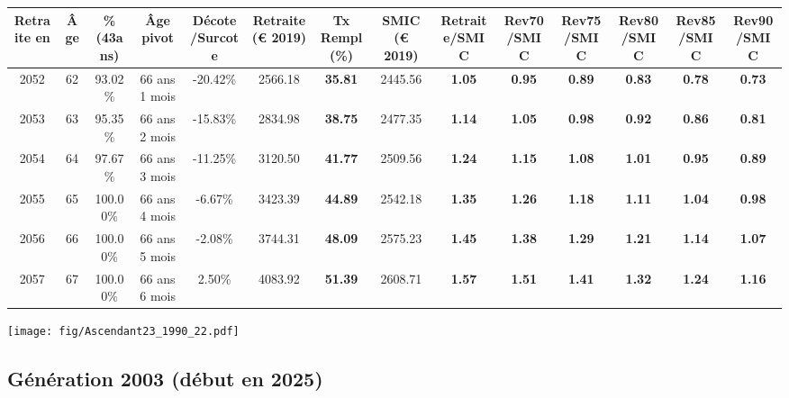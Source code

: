 \begin{adjustbox}{max width=\textwidth} 
\begin{tabular}[htb]{|c|c||c|c|c||c|c||c||c|c|c|c|c|c|} 
\hline 
 Retraite en &  Âge &  \%(43ans) &  Âge pivot &  Décote/Surcote &  Retraite (\euro{} 2019) &  Tx Rempl(\%) &  SMIC (\euro{} 2019) &  Retraite/SMIC &  Rev70/SMIC &  Rev75/SMIC &  Rev80/SMIC &  Rev85/SMIC &  Rev90/SMIC \\ 
\hline \hline 
 2052 &  62 &  93.02\% &  66 ans 1 mois &  -20.42\% &  2566.18 &  {\bf 35.81} &  2445.56 &  {\bf 1.05} &  {\bf {\color{red} 0.95}} &  {\bf {\color{red} 0.89}} &  {\bf {\color{red} 0.83}} &  {\bf {\color{red} 0.78}} &  {\bf {\color{red} 0.73}} \\ 
\hline 
 2053 &  63 &  95.35\% &  66 ans 2 mois &  -15.83\% &  2834.98 &  {\bf 38.75} &  2477.35 &  {\bf 1.14} &  {\bf 1.05} &  {\bf {\color{red} 0.98}} &  {\bf {\color{red} 0.92}} &  {\bf {\color{red} 0.86}} &  {\bf {\color{red} 0.81}} \\ 
\hline 
 2054 &  64 &  97.67\% &  66 ans 3 mois &  -11.25\% &  3120.50 &  {\bf 41.77} &  2509.56 &  {\bf 1.24} &  {\bf 1.15} &  {\bf 1.08} &  {\bf 1.01} &  {\bf {\color{red} 0.95}} &  {\bf {\color{red} 0.89}} \\ 
\hline 
 2055 &  65 &  100.00\% &  66 ans 4 mois &  -6.67\% &  3423.39 &  {\bf 44.89} &  2542.18 &  {\bf 1.35} &  {\bf 1.26} &  {\bf 1.18} &  {\bf 1.11} &  {\bf 1.04} &  {\bf {\color{red} 0.98}} \\ 
\hline 
 2056 &  66 &  100.00\% &  66 ans 5 mois &  -2.08\% &  3744.31 &  {\bf 48.09} &  2575.23 &  {\bf 1.45} &  {\bf 1.38} &  {\bf 1.29} &  {\bf 1.21} &  {\bf 1.14} &  {\bf 1.07} \\ 
\hline 
 2057 &  67 &  100.00\% &  66 ans 6 mois &  2.50\% &  4083.92 &  {\bf 51.39} &  2608.71 &  {\bf 1.57} &  {\bf 1.51} &  {\bf 1.41} &  {\bf 1.32} &  {\bf 1.24} &  {\bf 1.16} \\ 
\hline 
\hline 
\end{tabular} 
\end{adjustbox} 
 
 \vspace{0.1cm} 

 \begin{center}\texttt{[image: fig/Ascendant23\_1990\_22.pdf]}\end{center} \label{fig/Ascendant23_1990_22.pdf} 

\newpage 
 
\subsection{Génération 2003 (début en 2025)} 

